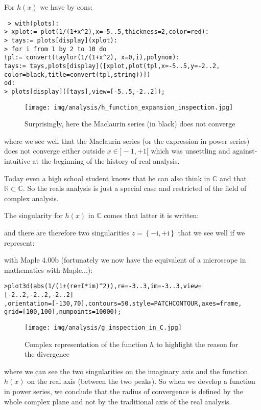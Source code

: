 	For $h(x)$ we have by cons:
	
	\texttt{
	> with(plots):\\
	> xplot:= plot(1/(1+x\string^2),x=-5..5,thickness=2,color=red):\\
	> tays:= plots[display](xplot):\\
	> for i from 1 by 2 to 10 do\\
		tpl:= convert(taylor(1/(1+x\string^2), x=0,i),polynom):\\
		tays:= tays,plots[display]([xplot,plot(tpl,x=-5..5,y=-2..2,\\
		color=black,title=convert(tpl,string))])\\
	od:\\
	> plots[display]([tays],view=[-5..5,-2..2]);\\
	}
	
	\begin{figure}[H]
		\begin{center}
			\texttt{[image: img/analysis/h\_function\_expansion\_inspection.jpg]}
		\end{center}	
		\caption{Surprisingly, here the Maclaurin series (in black) does not converge}
	\end{figure}
	where we see well that the Maclaurin series (or the expression in power series) does not converge either outside $x \in ]-1,+1[$ which was unsettling and against-intuitive at the beginning of the history of real analysis.
	
	Today even a high school student knows that he can also think in $\mathbb{C}$ and that $\mathbb{R} \subset \mathbb{C}$. So the reals analysis is just a special case and restricted of the field of complex analysis.
	
	The singularity for $h (x)$ in $\mathbb{C}$ comes that latter it is written:
	
	and there are therefore two singularities $z=\left\lbrace{-\mathrm{i},+\mathrm{i} }\right\rbrace$ that we see well if we represent:
	
	with Maple 4.00b (fortunately we now have the equivalent of a microscope in mathematics with Maple...):
	
	\texttt{>plot3d(abs(1/(1+(re+I*im)\string^2)),re=-3..3,im=-3..3,view=[-2..2,-2..2,-2..2]\\
	,orientation=[-130,70],contours=50,style=PATCHCONTOUR,axes=frame,\\
	grid=[100,100],numpoints=10000);}
	
	\begin{figure}[H]
		\begin{center}
			\texttt{[image: img/analysis/g\_inspection\_in\_C.jpg]}
		\end{center}	
		\caption{Complex representation of the function $h$ to highlight the reason for the divergence}
	\end{figure}
	where we can see the two singularities on the imaginary axis and the function $h (x)$ on the real axis (between the two peaks). So when we develop a function in power series, we conclude that the radius of convergence is defined by the whole complex plane and not by the traditional axis of the real analysis.
	
